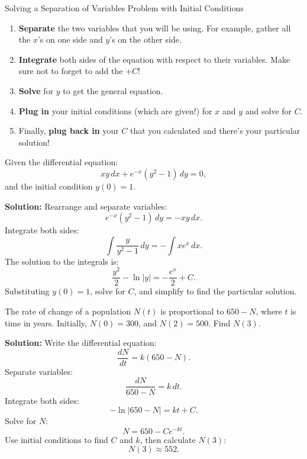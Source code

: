 \documentclass[12pt]{article}
\theoremstyle{beautifulthm}
\begin{document}
\begin{Note}{Solving a Separation of Variables Problem with Initial Conditions}{}
    \begin{enumerate}
    \item \textbf{Separate} the two variables that you will be using. For example, gather all the $x$'s on one side and $y$'s on the other side.
    \item \textbf{Integrate} both sides of the equation with respect to their variables. Make sure not to forget to add the $+C$!
    \item \textbf{Solve} for $y$ to get the general equation.
    \item \textbf{Plug in} your initial conditions (which are given!) for $x$ and $y$ and solve for $C$.
    \item Finally, \textbf{plug back in} your $C$ that you calculated and there’s your particular solution!
\end{enumerate}
\end{Note}





\begin{tcolorbox}[colback=examplebg, colframe=red!75!black, title=\textbf{EXAMPLE 1: Finding a Particular Solution}, fonttitle=\bfseries, sharp corners]
Given the differential equation:
\[
xy \, dx + e^{-x}(y^2 - 1) \, dy = 0,
\]
and the initial condition $y(0) = 1$.


\tcblower
\textbf{Solution:} 
Rearrange and separate variables:
\[
e^{-x}(y^2 - 1) \, dy = -xy \, dx.
\]
Integrate both sides:
\[
\int \frac{y}{y^2 - 1} \, dy = -\int x e^x \, dx.
\]
The solution to the integrals is:
\[
\frac{y^2}{2} - \ln|y| = -\frac{e^x}{2} + C.
\]
Substituting $y(0) = 1$, solve for $C$, and simplify to find the particular solution.
\end{tcolorbox}


\begin{tcolorbox}[colback=examplebg, colframe=red!75!black, title=\textbf{EXAMPLE 2: Population Model}, fonttitle=\bfseries, sharp corners]
The rate of change of a population $N(t)$ is proportional to $650 - N$, where $t$ is time in years. Initially, $N(0) = 300$, and $N(2) = 500$. Find $N(3)$.


\tcblower
\textbf{Solution:} 
Write the differential equation:
\[
\frac{dN}{dt} = k(650 - N).
\]
Separate variables:
\[
\frac{dN}{650 - N} = k \, dt.
\]
Integrate both sides:
\[
-\ln|650 - N| = kt + C.
\]
Solve for $N$:
\[
N = 650 - Ce^{-kt}.
\]
Use initial conditions to find $C$ and $k$, then calculate $N(3)$:
\[
N(3) \approx 552.
\]
\end{tcolorbox}
\end{document}

